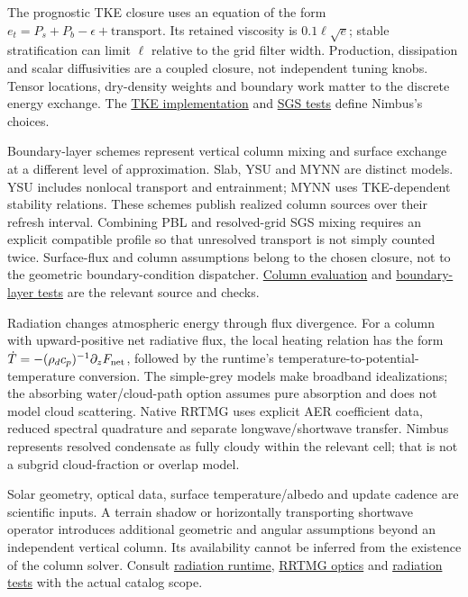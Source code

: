 \documentclass[
  11pt,
]{report}
\begin{document}
The prognostic TKE closure uses an equation of the form
\(e_t=P_s+P_b-\epsilon+\text{transport}\). Its retained viscosity is
\(0.1\ell\sqrt e\); stable stratification can limit \(\ell\) relative to
the grid filter width. Production, dissipation and scalar diffusivities
are a coupled closure, not independent tuning knobs. Tensor locations,
dry-density weights and boundary work matter to the discrete energy
exchange. The \href{../src/turbulence/schemes/tke/tke.cpp}{TKE
implementation} and \href{../tests/physics/test_turbulence_sgs.cpp}{SGS
tests} define Nimbus's choices.

Boundary-layer schemes represent vertical column mixing and surface
exchange at a different level of approximation. Slab, YSU and MYNN are
distinct models. YSU includes nonlocal transport and entrainment; MYNN
uses TKE-dependent stability relations. These schemes publish realized
column sources over their refresh interval. Combining PBL and
resolved-grid SGS mixing requires an explicit compatible profile so that
unresolved transport is not simply counted twice. Surface-flux and
column assumptions belong to the chosen closure, not to the geometric
boundary-condition dispatcher.
\href{../src/boundary_layer/column_evaluation.cpp}{Column evaluation}
and \href{../tests/physics/test_boundary_layer.cpp}{boundary-layer
tests} are the relevant source and checks.

Radiation changes atmospheric energy through flux divergence. For a
column with upward-positive net radiative flux, the local heating
relation has the form \(\dot T=-(\rho_dc_p)^{-1}\partial_zF_{\rm net}\),
followed by the runtime's temperature-to-potential-temperature
conversion. The simple-grey models make broadband idealizations; the
absorbing water/cloud-path option assumes pure absorption and does not
model cloud scattering. Native RRTMG uses explicit AER coefficient data,
reduced spectral quadrature and separate longwave/shortwave transfer.
Nimbus represents resolved condensate as fully cloudy within the
relevant cell; that is not a subgrid cloud-fraction or overlap model.

Solar geometry, optical data, surface temperature/albedo and update
cadence are scientific inputs. A terrain shadow or horizontally
transporting shortwave operator introduces additional geometric and
angular assumptions beyond an independent vertical column. Its
availability cannot be inferred from the existence of the column solver.
Consult \href{../src/radiation/runtime.cpp}{radiation runtime},
\href{../src/radiation/schemes/rrtmg/rrtmg_cloud_optics.cpp}{RRTMG
optics} and \href{../tests/physics/test_radiation.cpp}{radiation tests}
with the actual catalog scope.
\end{document}
